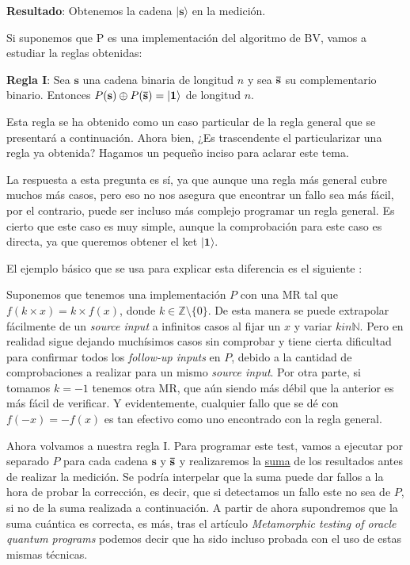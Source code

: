  \vspace{30pt}

 \textbf{Resultado}: Obtenemos la cadena $|\mathbf{s}\rangle$ en la medición.\newline

 Si suponemos que P es una implementación del algoritmo de BV, vamos a estudiar la reglas obtenidas: \newline

 \textbf{Regla I}\label{R:BV:1}: Sea $\mathbf{s}$ una cadena binaria de longitud $n$ y sea $\mathbf{\Bar{s}}$ su complementario binario. Entonces $P(\mathbf{s})\oplus P(\mathbf{\Bar{s}})=|\mathbf{1}\rangle$ de longitud $n$.\newline

 Esta regla se ha obtenido como un caso particular de la regla general que se presentará a continuación. Ahora bien, ¿Es trascendente el particularizar una regla ya obtenida? Hagamos un pequeño inciso para aclarar este tema.\newline

 La respuesta a esta pregunta es sí, ya que aunque una regla más general cubre muchos más casos, pero eso no nos asegura que encontrar un fallo sea más fácil, por el contrario, puede ser incluso más complejo programar un regla general. Es cierto que este caso es muy simple, aunque la comprobación para este caso es directa, ya que queremos obtener el ket $|\mathbf{1}\rangle$. \newline

 El ejemplo básico que se usa para explicar esta diferencia es el siguiente \cite{AR:MTmain:2008}:\newline

Suponemos que tenemos una implementación $P$ con una MR tal que $f(k\times x)=k\times f(x)$, donde $k \in \mathbb{Z} \setminus \{0\}$. De esta manera se puede extrapolar fácilmente de un \textit{source input} a infinitos casos al fijar un $x$ y variar $k in \mathbb{N}$. Pero en realidad sigue dejando muchísimos casos sin comprobar y tiene cierta dificultad para confirmar todos los \textit{follow-up inputs} en $P$, debido a la cantidad de comprobaciones a realizar para un mismo \textit{source input}. Por otra parte, si tomamos $k=-1$ tenemos otra MR, que aún siendo más débil que la anterior es más fácil de verificar. Y evidentemente, cualquier fallo que se dé con $f(-x)=-f(x)$ es tan efectivo como uno encontrado con la regla general.\newline

Ahora volvamos a nuestra regla I. Para programar este test, vamos a ejecutar por separado $P$ para cada cadena $\mathbf{s}$ y $\mathbf{\Bar{s}}$ y realizaremos la \hyperref[Sec3.1:Suma]{suma} de los resultados antes de realizar la medición. Se podría interpelar que la suma puede dar fallos a la hora de probar la corrección, es decir, que si detectamos un fallo este no sea de $P$, si no de la suma realizada a continuación. A partir de ahora supondremos que la suma cuántica es correcta, es más, tras el artículo \textit{Metamorphic testing of oracle quantum programs}\cite{metamorphicAdd:2022} podemos decir que ha sido incluso probada con el uso de estas mismas técnicas. \newline

